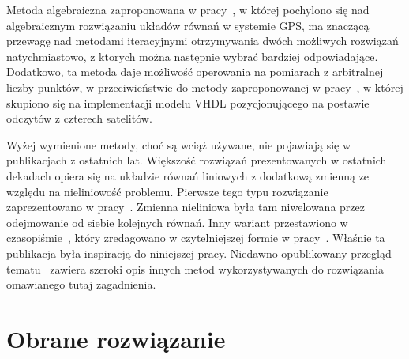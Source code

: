 Metoda algebraiczna zaproponowana w pracy~\cite{4104017}, w której pochylono się nad algebraicznym rozwiązaniu układów równań w systemie GPS, ma znaczącą przewagę nad metodami iteracyjnymi otrzymywania dwóch możliwych rozwiązań natychmiastowo, z ktorych można następnie wybrać bardziej odpowiadające. Dodatkowo, ta metoda daje możliwość operowania na pomiarach z arbitralnej liczby punktów, w przeciwieństwie do metody zaproponowanej w pracy~\cite{article}, w której skupiono się na implementacji modelu VHDL pozycjonującego na postawie odczytów z czterech satelitów.

Wyżej wymienione metody, choć są wciąż używane, nie pojawiają się w publikacjach z ostatnich lat. Większość rozwiązań prezentowanych w ostatnich dekadach opiera się na układzie równań liniowych z dodatkową zmienną ze względu na nieliniowość problemu. Pierwsze tego typu rozwiązanie zaprezentowano w pracy~\cite{301830}. Zmienna nieliniowa była tam niwelowana przez odejmowanie od siebie kolejnych równań. Inny wariant przestawiono w czasopiśmie~\cite{1018778}, który zredagowano w czytelniejszej formie w pracy~\cite{norrdine2012algebraic}. Właśnie ta publikacja była inspiracją do niniejszej pracy. Niedawno opublikowany przegląd tematu~\cite{10419087} zawiera szeroki opis innych metod wykorzystywanych do rozwiązania omawianego tutaj zagadnienia.

\section{Obrane rozwiązanie}

